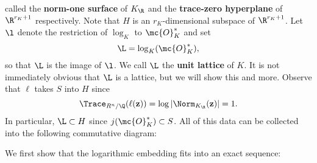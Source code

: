      called the \textbf{norm-one surface} of $K_{\R}$ and the \textbf{trace-zero hyperplane} of $\R^{r_{K}+1}$ respectively. Note that $H$ is an $r_{K}$-dimensional subspace of $\R^{r_{K}+1}$. Let $\l$ denote the restriction of $\log_{K}$ to $\mc{O}_{K}^{\ast}$ and set
      \[
        \L = \log_{K}(\mc{O}_{K}^{\ast}),
      \]
      so that $\L$ is the image of $\l$. We call $\L$ the \textbf{unit lattice} of $K$. It is not immediately obvious that $\L$ is a lattice, but we will show this and more. Observe that $\ell$ takes $S$ into $H$ since
      \[
        \Trace_{R^{n}/\Q}(\ell(\mathbf{z})) = \log|\Norm_{K_{\R}}(\mathbf{z})| = 1.
      \]
      In particular, $\L \subset H$ since $j(\mc{O}_{K}^{\ast}) \subset S$. All of this data can be collected into the following commutative diagram:

      \begin{center}
      \end{center}
      
      We first show that the logarithmic embedding fits into an exact sequence:

